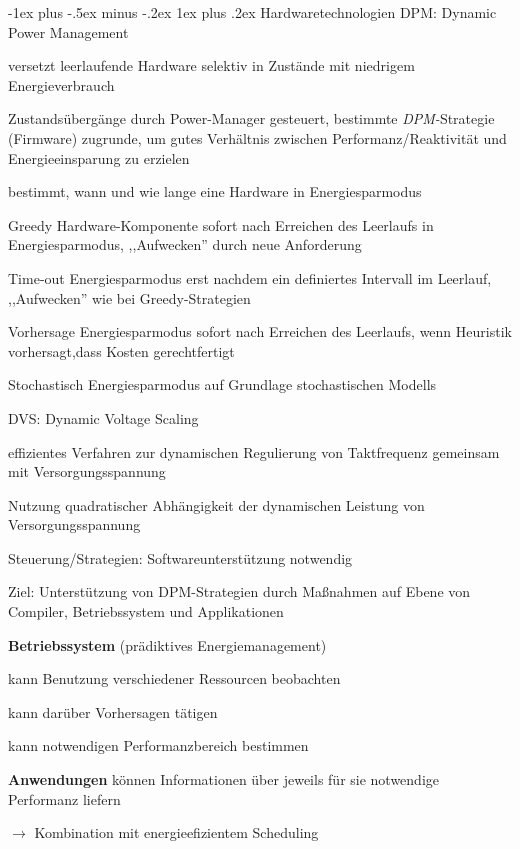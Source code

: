 \documentclass[a4paper]{article}
\makeatletter
\renewcommand{\subsubsection}{\@startsection{subsubsection}{3}{0mm}%
 {-1ex plus -.5ex minus -.2ex}%
 {1ex plus .2ex}%
 {\normalfont\small\bfseries}}
\makeatother
\begin{document}
\begin{multicols}{3}
    \subsubsection{Hardwaretechnologien}
    DPM: Dynamic Power Management
    \begin{itemize*}
        \item versetzt leerlaufende Hardware selektiv in Zustände mit niedrigem Energieverbrauch
        \item Zustandsübergänge durch Power-Manager gesteuert, bestimmte \emph{DPM-}Strategie (Firmware) zugrunde, um gutes Verhältnis zwischen Performanz/Reaktivität und Energieeinsparung zu erzielen
        \item bestimmt, wann und wie lange eine Hardware in Energiesparmodus
    \end{itemize*}
    \begin{description*}
        \item[Greedy] Hardware-Komponente sofort nach Erreichen des Leerlaufs in Energiesparmodus, ,,Aufwecken'' durch neue Anforderung
        \item[Time-out] Energiesparmodus erst nachdem ein definiertes Intervall im Leerlauf, ,,Aufwecken'' wie bei Greedy-Strategien
        \item[Vorhersage] Energiesparmodus sofort nach Erreichen des Leerlaufs, wenn Heuristik vorhersagt,dass Kosten gerechtfertigt
        \item[Stochastisch] Energiesparmodus auf Grundlage stochastischen Modells
    \end{description*}

    DVS: Dynamic Voltage Scaling
    \begin{itemize*}
        \item effizientes Verfahren zur dynamischen Regulierung von Taktfrequenz gemeinsam mit Versorgungsspannung
        \item Nutzung quadratischer Abhängigkeit der dynamischen Leistung von Versorgungsspannung
        \item Steuerung/Strategien: Softwareunterstützung notwendig
        \item Ziel: Unterstützung von DPM-Strategien durch Maßnahmen auf Ebene von Compiler, Betriebssystem und Applikationen
        \item \textbf{Betriebssystem} (prädiktives Energiemanagement)
        \begin{itemize*}
            \item kann Benutzung verschiedener Ressourcen beobachten
            \item kann darüber Vorhersagen tätigen
            \item kann notwendigen Performanzbereich bestimmen
        \end{itemize*}
        \item \textbf{Anwendungen} können Informationen über jeweils für sie notwendige Performanz liefern
        \item $\rightarrow$ Kombination mit energieefizientem Scheduling
    \end{itemize*}


\end{multicols}
\end{document}
